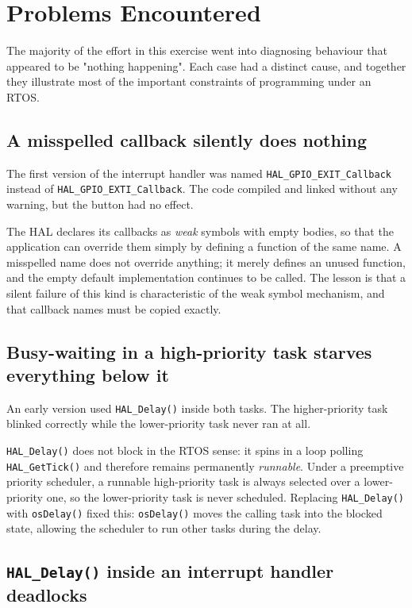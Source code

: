 \documentclass[11pt,a4paper]{article}
\begin{document}
\section{Problems Encountered}
\label{sec:problems}

The majority of the effort in this exercise went into diagnosing behaviour
that appeared to be "nothing happening". Each case had a distinct cause, and
together they illustrate most of the important constraints of programming
under an RTOS.

\subsection{A misspelled callback silently does nothing}

The first version of the interrupt handler was named
\texttt{HAL\_GPIO\_EXIT\_Callback} instead of
\texttt{HAL\_GPIO\_EXTI\_Callback}. The code compiled and linked without any
warning, but the button had no effect.

The HAL declares its callbacks as \emph{weak} symbols with empty bodies, so
that the application can override them simply by defining a function of the
same name. A misspelled name does not override anything; it merely defines an
unused function, and the empty default implementation continues to be called.
The lesson is that a silent failure of this kind is characteristic of the weak
symbol mechanism, and that callback names must be copied exactly.

\subsection{Busy-waiting in a high-priority task starves everything below it}

An early version used \texttt{HAL\_Delay()} inside both tasks. The
higher-priority task blinked correctly while the lower-priority task never ran
at all.

\texttt{HAL\_Delay()} does not block in the RTOS sense: it spins in a loop
polling \texttt{HAL\_GetTick()} and therefore remains permanently
\emph{runnable}. Under a preemptive priority scheduler, a runnable
high-priority task is always selected over a lower-priority one, so the
lower-priority task is never scheduled. Replacing \texttt{HAL\_Delay()} with
\texttt{osDelay()} fixed this: \texttt{osDelay()} moves the calling task into
the blocked state, allowing the scheduler to run other tasks during the delay.

\subsection{\texttt{HAL\_Delay()} inside an interrupt handler deadlocks}
\end{document}
